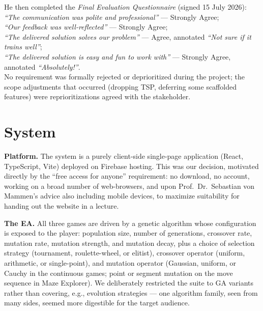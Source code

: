 \documentclass[conference]{IEEEtran}
\begin{document}
He then completed the \emph{Final Evaluation Questionnaire} (signed 15 July 2026): \\
\emph{``The communication was polite and professional''} --- Strongly Agree;\\
\emph{``Our feedback was well-reflected''} --- Strongly Agree;\\
\emph{``The delivered solution solves our problem''} --- Agree, annotated \emph{``Not sure if it trains well''};\\
\emph{``The delivered solution is easy and fun to work with''} --- Strongly Agree, annotated \emph{``Absolutely!''}.\\
No requirement was formally rejected or deprioritized during the project; the scope adjustments that occurred (dropping TSP, deferring some scaffolded features) were reprioritizations agreed with the stakeholder.

\section{System}
\label{sec:system}
\textbf{Platform.} The system is a purely client-side single-page application (React, TypeScript, Vite) deployed on Firebase hosting. This was our decision, motivated directly by the ``free access for anyone'' requirement: no download, no account, working on a broad number of web-browsers, and upon Prof.\ Dr.\ Sebastian von Mammen's advice also including mobile devices, to maximize suitability for handing out the website in a lecture.

\textbf{The EA.} All three games are driven by a genetic algorithm whose configuration is exposed to the player: population size, number of generations, crossover rate, mutation rate, mutation strength, and mutation decay, plus a choice of selection strategy (tournament, roulette-wheel, or elitist), crossover operator (uniform, arithmetic, or single-point), and mutation operator (Gaussian, uniform, or Cauchy in the continuous games; point or segment mutation on the move sequence in Maze Explorer). We deliberately restricted the suite to GA variants rather than covering, e.g., evolution strategies --- one algorithm family, seen from many sides, seemed more digestible for the target audience.
\end{document}
